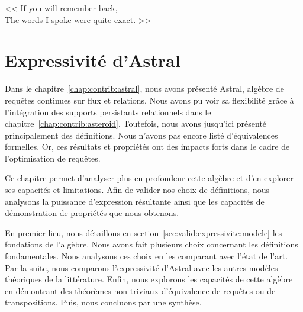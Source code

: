 \begin{savequote}[6cm]
<< If you will remember back,\\ The words I spoke were quite exact. >>
\end{savequote}

\chapter{Expressivité d'Astral}\label{chap:validation:expressivite}
\chaptertoc

Dans le chapitre~\ref{chap:contrib:astral}, nous avons présenté Astral, algèbre de requêtes continues sur flux et relations. Nous avons pu voir sa flexibilité grâce à l'intégration des supports persistants relationnels dans le chapitre~\ref{chap:contrib:asteroid}. Toutefois, nous avons jusqu'ici présenté principalement des définitions. Nous n'avons pas encore listé d'équivalences formelles. Or, ces résultats et propriétés ont des impacts forts dans le cadre de l'optimisation de requêtes.

Ce chapitre permet d'analyser plus en profondeur cette algèbre et d'en explorer ses capacités et limitations. Afin de valider nos choix de définitions, nous analysons la puissance d'expression résultante ainsi que les capacités de démonstration de propriétés que nous obtenons.

En premier lieu, nous détaillons en section~\ref{sec:valid:expressivite:modele} les fondations de l'algèbre. Nous avons fait plusieurs choix concernant les définitions fondamentales. Nous analysons ces choix en les comparant avec l'état de l'art. Par la suite, nous comparons l'expressivité d'Astral avec les autres modèles théoriques de la littérature. Enfin, nous explorons les capacités de cette algèbre en démontrant des théorèmes non-triviaux d'équivalence de requêtes ou de transpositions. Puis, nous concluons par une synthèse.




